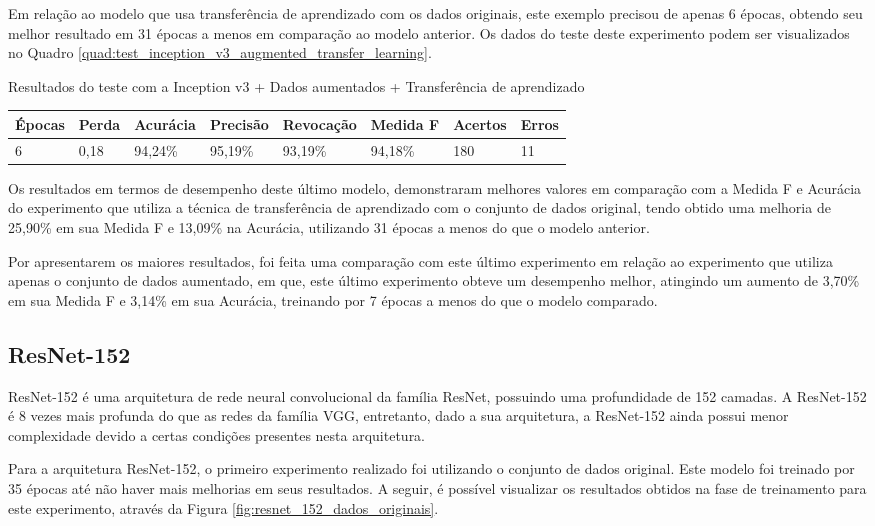 \documentclass[
	12pt,				%
	oneside,			%
	a4paper,			%
	english,			%
	brazil				%
	]{abntex2ppgsi}
\begin{document}
Em relação ao modelo que usa transferência de aprendizado com os dados originais, este exemplo precisou de apenas 6 épocas, obtendo seu melhor resultado em 31 épocas a menos em comparação ao modelo anterior. Os dados do teste deste experimento podem ser visualizados no Quadro \ref{quad:test_inception_v3_augmented_transfer_learning}.

\begin{quadro}[H]
\caption{Resultados do teste com a Inception v3 + Dados aumentados + Transferência de aprendizado}
\label{quad:test_inception_v3_augmented_transfer_learning}
\centering
\begin{tabular}{|l|l|l|l|l|l|l|l|}
\cline{1-8}
Épocas & Perda & Acurácia & Precisão & Revocação & Medida F & Acertos & Erros \\ \hline
6 & 0,18 & 94,24\% & 95,19\% & 93,19\% & 94,18\% & 180 & 11 \\
\cline{1-8}
\end{tabular}
\end{quadro}

Os resultados em termos de desempenho deste último modelo, demonstraram melhores valores em comparação com a Medida F e Acurácia do experimento que utiliza a técnica de transferência de aprendizado com o conjunto de dados original, tendo obtido uma melhoria de 25,90\% em sua Medida F e 13,09\% na Acurácia, utilizando 31 épocas a menos do que o modelo anterior. 

Por apresentarem os maiores resultados, foi feita uma comparação com este último experimento em relação ao experimento que utiliza apenas o conjunto de dados aumentado, em que, este último experimento obteve um desempenho melhor, atingindo um aumento de 3,70\% em sua Medida F e 3,14\% em sua Acurácia, treinando por 7 épocas a menos do que o modelo comparado.

\subsection{ResNet-152}
\label{subsec:result_resnet_152}
ResNet-152 é uma arquitetura de rede neural convolucional da família ResNet, possuindo uma profundidade de 152 camadas. A ResNet-152 é 8 vezes mais profunda do que as redes da família VGG, entretanto, dado a sua arquitetura, a ResNet-152 ainda possui menor complexidade \cite{he2016deep} devido a certas condições presentes nesta arquitetura. 

Para a arquitetura ResNet-152, o primeiro experimento realizado foi utilizando o conjunto de dados original. Este modelo foi treinado por 35 épocas até não haver mais melhorias em seus resultados. A seguir, é possível visualizar os resultados obtidos na fase de treinamento para este experimento, através da Figura \ref{fig:resnet_152_dados_originais}.
\end{document}
